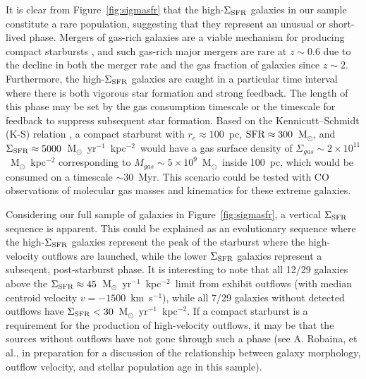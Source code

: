 \documentclass[apj]{emulateapj}
\newcommand{\kms}{km~s$^{-1}$}
\newcommand{\msun}{M$_{\odot}$}
\newcommand{\units}{M$_{\odot}$~yr$^{-1}$~kpc$^{-2}$}
\newcommand{\sigmasfr}{\Sigma_{\textnormal{\scriptsize{SFR}}}}
\begin{document}
It is clear from Figure~\ref{fig:sigmasfr} that the high-$\sigmasfr$
galaxies in our sample constitute a rare population, suggesting that
they represent an unusual or short-lived phase.  Mergers of gas-rich
galaxies are a viable mechanism for producing compact starbursts
\citep[e.g.,][]{mih96}, and such gas-rich major mergers are rare at
$z\sim0.6$ due to the decline in both the merger rate
\citep[e.g.,][]{lot11} and the gas fraction \citep[e.g.,][]{tac10} of
galaxies since $z\sim2$.  Furthermore, the high-$\sigmasfr$ galaxies
are caught in a particular time interval where there is both vigorous
star formation and strong feedback.  The length of this phase may be
set by the gas consumption timescale or the timescale for feedback to
suppress subsequent star formation.  Based on the Kennicutt--Schmidt
(K-S) relation \citep{ken98}, a compact starburst with
$r_e\approx100$~pc, $\textnormal{SFR}\approx300$~\msun, and
$\sigmasfr\approx5000$~\units\ would have a gas surface density of
$\Sigma_{gas}\sim2\times10^{11}$~\msun~kpc$^{-2}$ corresponding to
$M_{gas}\sim5\times10^{9}$~\msun\ inside 100~pc, which would be
consumed on a timescale $\sim30$~Myr.  This scenario could be tested
with CO observations of molecular gas masses and kinematics for these
extreme galaxies.


Considering our full sample of galaxies in Figure~\ref{fig:sigmasfr},
a vertical $\sigmasfr$ sequence is apparent.  This could be explained
as an evolutionary sequence where the high-$\sigmasfr$ galaxies
represent the peak of the starburst where the high-velocity outflows
are launched, while the lower $\sigmasfr$ galaxies represent a
subseqent, post-starburst phase.  It is interesting to note that all
12/29 galaxies above the $\sigmasfr\approx45$~\units\ limit from
\citet{meu97} exhibit outflows (with median centroid velocity
$v=-1500$~\kms), while all 7/29 galaxies without detected outflows
have $\sigmasfr<30$~\units.  If a compact starburst is a requirement
for the production of high-velocity outflows, it may be that the
sources without outflows have not gone through such a phase (see
A. Robaina, et al., in preparation for a discussion of the
relationship between galaxy morphology, outflow velocity, and stellar
population age in this sample).
\end{document}

